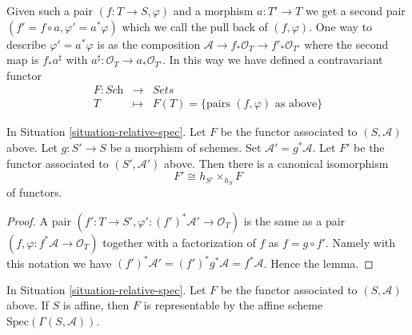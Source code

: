 \medskip\noindent
Given such a
pair $(f : T \to S, \varphi)$ and a morphism $a : T' \to T$ we get
a second pair $(f' = f \circ a, \varphi' = a^*\varphi)$ which we
call the pull back of $(f, \varphi)$. One way to describe
$\varphi' = a^*\varphi$ is as the composition
$\mathcal{A} \to f_*\mathcal{O}_T \to f'_*\mathcal{O}_{T'}$
where the second map is $f_*a^\sharp$ with
$a^\sharp : \mathcal{O}_T \to a_*\mathcal{O}_{T'}$.
In this way we have defined a contravariant functor
\begin{eqnarray}
\label{equation-spec}
F : \textit{Sch} & \longrightarrow & \textit{Sets} \\
T & \longmapsto & F(T) = \{\text{pairs }(f, \varphi) \text{ as above}\}
\nonumber
\end{eqnarray}

\begin{lemma}
\label{lemma-spec-base-change}
In Situation \ref{situation-relative-spec}.
Let $F$ be the functor
associated to $(S, \mathcal{A})$ above.
Let $g : S' \to S$ be a morphism of schemes.
Set $\mathcal{A}' = g^*\mathcal{A}$. Let $F'$ be the
functor associated to $(S', \mathcal{A}')$ above.
Then there is a canonical isomorphism
$$
F' \cong h_{S'} \times_{h_S} F
$$
of functors.
\end{lemma}

\begin{proof}
A pair $(f' : T \to S', \varphi' : (f')^*\mathcal{A}' \to \mathcal{O}_T)$
is the same as a pair $(f, \varphi : f^*\mathcal{A} \to \mathcal{O}_T)$
together with a factorization of $f$ as $f = g \circ f'$. Namely with
this notation we have
$(f')^* \mathcal{A}' = (f')^*g^*\mathcal{A} = f^*\mathcal{A}$.
Hence the lemma.
\end{proof}

\begin{lemma}
\label{lemma-spec-affine}
In Situation \ref{situation-relative-spec}.
Let $F$ be the functor associated to $(S, \mathcal{A})$ above.
If $S$ is affine, then $F$ is representable by the
affine scheme $\text{Spec}(\Gamma(S, \mathcal{A}))$.
\end{lemma}

